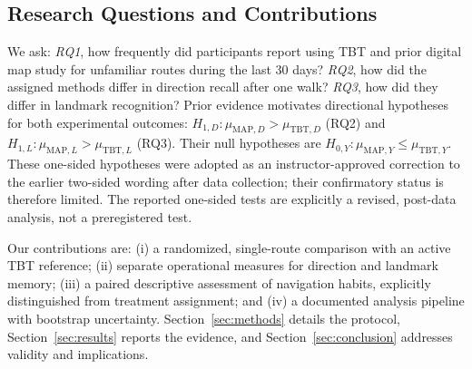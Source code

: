 \subsection{Research Questions and Contributions}
We ask: \emph{RQ1}, how frequently did participants report using TBT and prior digital map study for unfamiliar routes during the last 30 days? \emph{RQ2}, how did the assigned methods differ in direction recall after one walk? \emph{RQ3}, how did they differ in landmark recognition? Prior evidence motivates directional hypotheses for both experimental outcomes: $H_{1,D}:\mu_{\mathrm{MAP},D}>\mu_{\mathrm{TBT},D}$ (RQ2) and $H_{1,L}:\mu_{\mathrm{MAP},L}>\mu_{\mathrm{TBT},L}$ (RQ3). Their null hypotheses are $H_{0,Y}:\mu_{\mathrm{MAP},Y}\leq\mu_{\mathrm{TBT},Y}$. These one-sided hypotheses were adopted as an instructor-approved correction to the earlier two-sided wording after data collection; their confirmatory status is therefore limited. The reported one-sided tests are explicitly a revised, post-data analysis, not a preregistered test.

Our contributions are: (i) a randomized, single-route comparison with an active TBT reference; (ii) separate operational measures for direction and landmark memory; (iii) a paired descriptive assessment of navigation habits, explicitly distinguished from treatment assignment; and (iv) a documented analysis pipeline with bootstrap uncertainty. Section~\ref{sec:methods} details the protocol, Section~\ref{sec:results} reports the evidence, and Section~\ref{sec:conclusion} addresses validity and implications.

